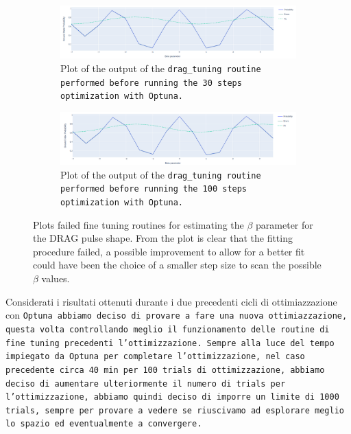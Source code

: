 \begin{figure}[h!]
        \centering
    \begin{subfigure}[t]{0.45\textwidth}
        \includegraphics[width=\textwidth]{figures/png/RB_optimization/beta30.png}
        \caption{Plot of the output of the \tt{drag\_tuning} routine performed before running the 30 steps optimization with \tt{Optuna}.}
        \label{fig:failed_beta:30}
    \end{subfigure}
    \hfill
    \begin{subfigure}[t]{0.45\textwidth}
        \includegraphics[width=\textwidth]{figures/png/RB_optimization/beta100.png}
        \caption{Plot of the output of the \tt{drag\_tuning} routine performed before running the 100 steps optimization with \tt{Optuna}.}
        \label{fig:failed_beta:100}
    \end{subfigure}

    \caption{Plots failed fine tuning routines for estimating the $\beta$ parameter for the DRAG pulse shape. 
    From the plot is clear that the fitting procedure failed, a possible improvement to allow for a better fit could have been the choice of a smaller step size to scan the possible $\beta$ values.}
    \label{fig:failed_beta}
\end{figure}

Considerati i risultati ottenuti durante i due precedenti cicli di ottimiazzazione con \tt{Optuna} abbiamo deciso di provare a fare una nuova ottimiazzazione, questa volta controllando meglio il funzionamento delle routine di fine tuning precedenti l'ottimizzazione.
Sempre alla luce del tempo impiegato da \tt{Optuna} per completare l'ottimizzazione, nel caso precedente circa 40 min per 100 trials di ottimizzazione, abbiamo deciso di aumentare ulteriormente il numero di trials per l'ottimizzazione, abbiamo quindi deciso di imporre un limite di 1000 trials,
sempre per provare a vedere se riuscivamo ad esplorare meglio lo spazio ed eventualmente a convergere.

